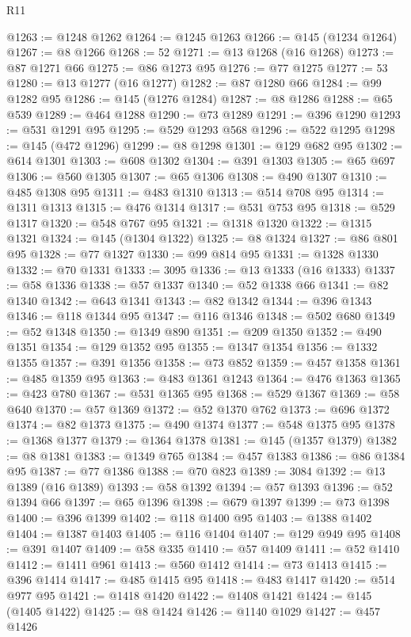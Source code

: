 \begin{lexlean}{R11}
\begin{coremodule}
@1263 := @1248 @1262
@1264 := @1245 @1263
@1266 := @145 (@1234 @1264)
@1267 := @8 @1266
@1268 := 52
@1271 := @13 @1268 (@16 @1268)
@1273 := @87 @1271 @66
@1275 := @86 @1273 @95
@1276 := @77 @1275
@1277 := 53
@1280 := @13 @1277 (@16 @1277)
@1282 := @87 @1280 @66
@1284 := @99 @1282 @95
@1286 := @145 (@1276 @1284)
@1287 := @8 @1286
@1288 := @65 @539
@1289 := @464 @1288
@1290 := @73 @1289
@1291 := @396 @1290
@1293 := @531 @1291 @95
@1295 := @529 @1293 @568
@1296 := @522 @1295
@1298 := @145 (@472 @1296)
@1299 := @8 @1298
@1301 := @129 @682 @95
@1302 := @614 @1301
@1303 := @608 @1302
@1304 := @391 @1303
@1305 := @65 @697
@1306 := @560 @1305
@1307 := @65 @1306
@1308 := @490 @1307
@1310 := @485 @1308 @95
@1311 := @483 @1310
@1313 := @514 @708 @95
@1314 := @1311 @1313
@1315 := @476 @1314
@1317 := @531 @753 @95
@1318 := @529 @1317
@1320 := @548 @767 @95
@1321 := @1318 @1320
@1322 := @1315 @1321
@1324 := @145 (@1304 @1322)
@1325 := @8 @1324
@1327 := @86 @801 @95
@1328 := @77 @1327
@1330 := @99 @814 @95
@1331 := @1328 @1330
@1332 := @70 @1331
@1333 := 3095
@1336 := @13 @1333 (@16 @1333)
@1337 := @58 @1336
@1338 := @57 @1337
@1340 := @52 @1338 @66
@1341 := @82 @1340
@1342 := @643 @1341
@1343 := @82 @1342
@1344 := @396 @1343
@1346 := @118 @1344 @95
@1347 := @116 @1346
@1348 := @502 @680
@1349 := @52 @1348
@1350 := @1349 @890
@1351 := @209 @1350
@1352 := @490 @1351
@1354 := @129 @1352 @95
@1355 := @1347 @1354
@1356 := @1332 @1355
@1357 := @391 @1356
@1358 := @73 @852
@1359 := @457 @1358
@1361 := @485 @1359 @95
@1363 := @483 @1361 @1243
@1364 := @476 @1363
@1365 := @423 @780
@1367 := @531 @1365 @95
@1368 := @529 @1367
@1369 := @58 @640
@1370 := @57 @1369
@1372 := @52 @1370 @762
@1373 := @696 @1372
@1374 := @82 @1373
@1375 := @490 @1374
@1377 := @548 @1375 @95
@1378 := @1368 @1377
@1379 := @1364 @1378
@1381 := @145 (@1357 @1379)
@1382 := @8 @1381
@1383 := @1349 @765
@1384 := @457 @1383
@1386 := @86 @1384 @95
@1387 := @77 @1386
@1388 := @70 @823
@1389 := 3084
@1392 := @13 @1389 (@16 @1389)
@1393 := @58 @1392
@1394 := @57 @1393
@1396 := @52 @1394 @66
@1397 := @65 @1396
@1398 := @679 @1397
@1399 := @73 @1398
@1400 := @396 @1399
@1402 := @118 @1400 @95
@1403 := @1388 @1402
@1404 := @1387 @1403
@1405 := @116 @1404
@1407 := @129 @949 @95
@1408 := @391 @1407
@1409 := @58 @335
@1410 := @57 @1409
@1411 := @52 @1410
@1412 := @1411 @961
@1413 := @560 @1412
@1414 := @73 @1413
@1415 := @396 @1414
@1417 := @485 @1415 @95
@1418 := @483 @1417
@1420 := @514 @977 @95
@1421 := @1418 @1420
@1422 := @1408 @1421
@1424 := @145 (@1405 @1422)
@1425 := @8 @1424
@1426 := @1140 @1029
@1427 := @457 @1426

\end{coremodule}
\end{lexlean}
